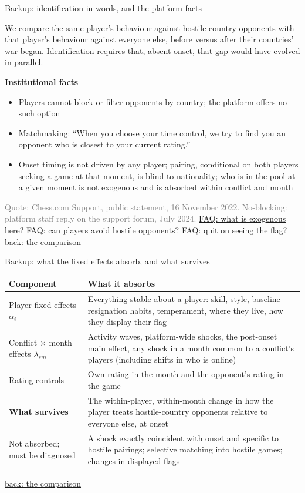 \documentclass[aspectratio=169,11pt,t]{beamer}
\newcommand{\fq}[2]{\hyperlink{#1}{\textcolor{linkblue}{\scriptsize\textsf{FAQ: #2}}}}
\newcommand{\backto}[2]{\vfill\hfill\hyperlink{#1}{\textcolor{linkblue}{\scriptsize\textsf{back: #2}}}}
\newcommand{\links}[1]{\vfill\hfill{#1}}
\newcommand{\src}[1]{{\vfill\scriptsize\textcolor{gray}{#1}}}
\begin{document}
\begin{frame}[label=bk-ident]{Backup: identification in words, and the platform facts}
  \small
  \begin{block}{}
    We compare the same player's behaviour against hostile-country opponents with that player's behaviour against everyone else, before versus after their countries' war began. Identification requires that, absent onset, that gap would have evolved in parallel.
  \end{block}
  \vspace{2mm}
  \textbf{Institutional facts}
  \begin{itemize}
    \item Players cannot block or filter opponents by country; the platform offers no such option
    \item Matchmaking: ``When you choose your time control, we try to find you an opponent who is closest to your current rating.''
    \item Onset timing is not driven by any player; pairing, conditional on both players seeking a game at that moment, is blind to nationality; who is in the pool at a given moment is not exogenous and is absorbed within conflict and month
  \end{itemize}
  \src{Quote: Chess.com Support, public statement, 16 November 2022. No-blocking: platform staff reply on the support forum, July 2024.}
  \links{\fq{faq-exogenous}{what is exogenous here?} \quad \fq{faq-avoid}{can players avoid hostile opponents?} \quad \fq{faq-quit}{quit on seeing the flag?}}
  \backto{comparison}{the comparison}
\end{frame}

\begin{frame}[label=bk-fe]{Backup: what the fixed effects absorb, and what survives}
  \small
  \begin{tabular}{@{}p{}p{}@{}}
    \toprule
    Component & What it absorbs \\
    \midrule
    Player fixed effects $\alpha_i$ & Everything stable about a player: skill, style, baseline resignation habits, temperament, where they live, how they display their flag \\[1.5mm]
    Conflict $\times$ month effects $\lambda_{sm}$ & Activity waves, platform-wide shocks, the post-onset main effect, any shock in a month common to a conflict's players (including shifts in who is online) \\[1.5mm]
    Rating controls & Own rating in the month and the opponent's rating in the game \\
    \midrule
    \textbf{What survives} & The within-player, within-month change in how the player treats hostile-country opponents relative to everyone else, at onset \\
    \midrule
    Not absorbed; must be diagnosed & A shock exactly coincident with onset and specific to hostile pairings; selective matching into hostile games; changes in displayed flags \\
    \bottomrule
  \end{tabular}
  \backto{comparison}{the comparison}
\end{frame}
\end{document}
